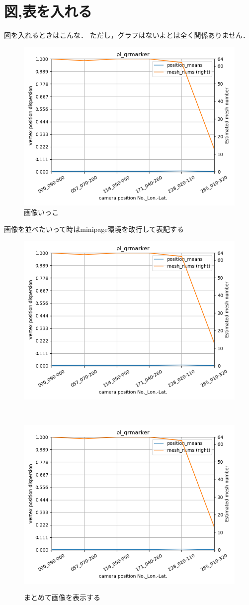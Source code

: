 \documentclass[11pt,twocolumn,a4paper, fleqn, uplatex]{ujarticle}
\begin{document}
\section{図,表を入れる}\label{sec2}
図を入れるときはこんな．
ただし，グラフはないよとは全く関係ありません．
\begin{figure}[htbp]
    \centering
    \includegraphics[width=0.7\linewidth]{img/fig.png}
    \caption{画像いっこ}
    \label{fig:label1}
\end{figure}

画像を並べたいって時はminipage環境を改行して表記する
\begin{figure}[htbp]
  \begin{minipage}[t]{\hsize}
    \centering
    \includegraphics[width=0.6\linewidth]{img/fig.png}
    \label{fig:niko1}
  \end{minipage}
    \\
  \begin{minipage}[t]{\hsize}
    \centering
    \includegraphics[width=0.6\linewidth]{img/fig.png}
    \label{fig:niko1}
  \end{minipage}
 \caption{まとめて画像を表示する}
\end{figure}
\end{document}
